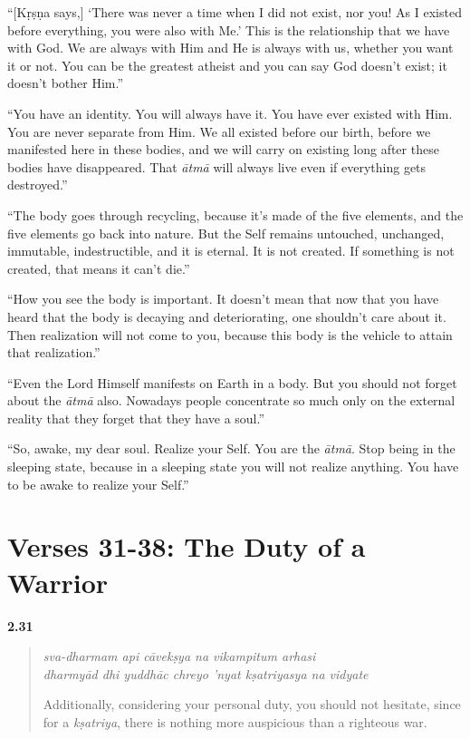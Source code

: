 \enquote{[Kṛṣṇa says,] \enquote{There was never a time when I did not exist, nor you! As I existed before everything, you were also with Me.} This is the relationship that we have with God. We are always with Him and He is always with us, whether you want it or not. You can be the greatest atheist and you can say God doesn’t exist; it doesn’t bother Him.}

\enquote{You have an identity. You will always have it. You have ever existed with Him. You are never separate from Him. We all existed before our birth, before we manifested here in these bodies, and we will carry on existing long after these bodies have disappeared. That \textit{ātmā} will always live even if everything gets destroyed.}

\enquote{The body goes through recycling, because it’s made of the five elements, and the five elements go back into nature. But the Self remains untouched, unchanged, immutable, indestructible, and it is eternal. It is not created. If something is not created, that means it can’t die.}

\enquote{How you see the body is important. It doesn’t mean that now that you have heard that the body is decaying and deteriorating, one shouldn’t care about it. Then realization will not come to you, because this body is the vehicle to attain that realization.}

\enquote{Even the Lord Himself manifests on Earth in a body. But you should not forget about the \textit{ātmā} also. Nowadays people concentrate so much only on the external reality that they forget that they have a soul.}


\enquote{So, awake, my dear soul. Realize your Self. You are the \textit{ātmā}. Stop being in the sleeping state, because in a sleeping state you will not realize anything. You have to be awake to realize your Self.}


\section{Verses 31-38: The Duty of a Warrior}\label{sec-verses-31-38-the-duty-of-a-warrior}


\par\noindent\textbf{2.31}\par
\begin{verse}
\textit{sva-dharmam api cāvekṣya na vikampitum arhasi} \\
\textit{dharmyād dhi yuddhāc chreyo ’nyat kṣatriyasya na vidyate}

\noindent Additionally, considering your personal duty, you should not hesitate, since for a \textit{kṣatriya}, there is nothing more auspicious than a righteous war.
\end{verse}
\par



